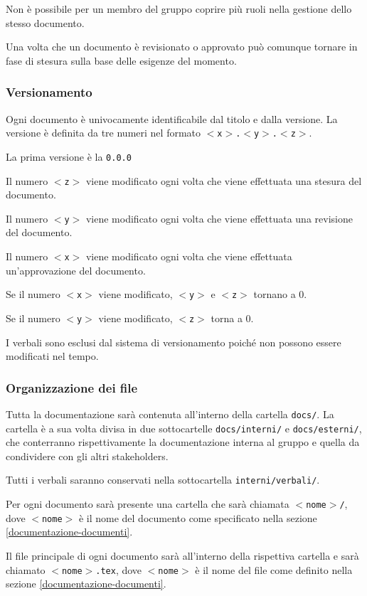 \documentclass[a4paper, 12pt]{article}
\begin{document}
Non è possibile per un membro del gruppo coprire più ruoli nella gestione dello stesso documento.

Una volta che un documento è revisionato o approvato può comunque tornare in fase di stesura sulla base delle esigenze del momento.

\subsubsection{Versionamento}
Ogni documento è univocamente identificabile dal titolo e dalla versione. La versione è definita da tre numeri nel formato \texttt{$<$x$>$.$<$y$>$.$<$z$>$}.

La prima versione è la \texttt{0.0.0}

Il numero \texttt{$<$z$>$} viene modificato ogni volta che viene effettuata una stesura del documento.

Il numero \texttt{$<$y$>$} viene modificato ogni volta che viene effettuata una revisione del documento.

Il numero \texttt{$<$x$>$} viene modificato ogni volta che viene effettuata un'approvazione del documento.

Se il numero \texttt{$<$x$>$} viene modificato, \texttt{$<$y$>$} e \texttt{$<$z$>$} tornano a 0.

Se il numero \texttt{$<$y$>$} viene modificato, \texttt{$<$z$>$} torna a 0.

I verbali sono esclusi dal sistema di versionamento poiché non possono essere modificati nel tempo.

\subsubsection{Organizzazione dei file}
Tutta la documentazione sarà contenuta all'interno della cartella \texttt{docs/}. La cartella è a sua volta divisa in due sottocartelle \texttt{docs/interni/} e \texttt{docs/esterni/}, che conterranno rispettivamente la documentazione interna al gruppo e quella da condividere con gli altri stakeholders.

Tutti i verbali saranno conservati nella sottocartella \texttt{interni/verbali/}.

Per ogni documento sarà presente una cartella che sarà chiamata \texttt{$<$nome$>$/}, dove \texttt{$<$nome$>$} è il nome del documento come specificato nella sezione \ref{documentazione-documenti}.

Il file principale di ogni documento sarà all'interno della rispettiva cartella e sarà chiamato \texttt{$<$nome$>$.tex}, dove \texttt{$<$nome$>$} è il nome del file come definito nella sezione \ref{documentazione-documenti}.
\end{document}
